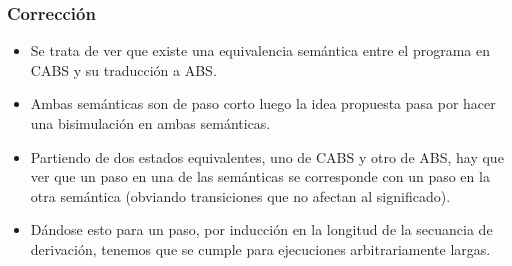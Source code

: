 \documentclass[spanish, a4paper, 12pt, final, slideColor, nototal, colorBG, pdf, noaccumulate, darkblue] {beamer}
\begin{document}
\begin{frame}[fragile]
  \frametitle{Corrección}
  \begin{itemize}
  \item Se trata de ver que existe una equivalencia semántica entre el programa en CABS y su traducción a ABS.
  \item Ambas semánticas son de paso corto luego la idea propuesta pasa por hacer una bisimulación en ambas semánticas.
  \item Partiendo de dos estados equivalentes, uno de CABS y otro de ABS, hay que ver que un paso en una de las semánticas se corresponde con un paso en la otra semántica (obviando transiciones que no afectan al significado).
  \item Dándose esto para un paso, por inducción en la longitud de la secuancia de derivación, tenemos que se cumple para ejecuciones arbitrariamente largas.
  \end{itemize}
\end{frame}
\end{document}
